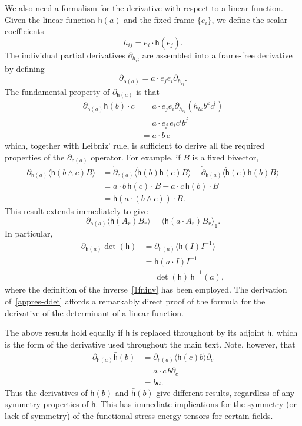 \documentclass[a4paper]{article}
\numberwithin{equation}{section}
\newcommand{\nn}{\nonumber}
\newcommand{\dt}{\! \cdot \!}
\newcommand{\wdg}{\! \wedge \!}
\newcommand{\la}{\langle}
\newcommand{\ra}{\rangle}
\newcommand{\eqv}{=}
\newcommand{\dc}{\partial_c}
\newcommand{\lih}{\mathsf{h}}
\newcommand{\lbh}{\bar{\mathsf{h}}}
\newcommand{\ho}{\lbh}
\newcommand{\hu}{\lih}
\newcommand{\dhua}{\partial_{\hu(a)}}
\newcommand{\dhu}{\dot{\lih}}
\begin{document}
We also need a formalism for the derivative with respect to a linear
function.  Given the linear function $\hu(a)$ and the fixed frame
$\{e_i\}$, we define the scalar coefficients
%
\begin{equation}
h_{ij} \eqv e_i \dt \hu(e_j).  
\label{6defhij}
\end{equation}
%
The individual partial derivatives $\partial_{h_{ij}}$ are
assembled into a frame-free derivative by defining
%
\begin{equation}
\dhua \eqv a \dt e_j e_i \partial_{h_{ij}}.
\label{appres-dhu}
\end{equation}
%
The fundamental property of $\dhua$ is that
%
\begin{align}
\dhua \hu(b) \dt c &=  a \dt e_j e_i \partial_{h_{ij}} (h_{lk} b^k
c^l) \nn \\
&=  a \dt e_j \, e_i c^i b^j \nn \\
&= a \dt b \, c
\end{align}
%
which, together with Leibniz' rule, is sufficient to derive all the
required properties of the $\dhua$ operator.  For example, if $B$ is a
fixed bivector, 
%
\begin{align} 
\dhua \la \hu(b \wdg c) B \ra 
&= \dot{\partial}_{\hu(a)} \la \dhu(b) \hu(c) B \ra -
\dot{\partial}_{\hu(a)} \la \dhu (c) \hu(b) B \ra \nn \\ 
&= a \dt b \, \hu(c) \dt B - a \dt c \, \hu(b) \dt B \nn \\
&= \hu(a \dt (b \wdg c)) \dt B .
\end{align}
%
This result extends immediately to give
%
\begin{equation}
\dhua \la \hu(A_r) B_r \ra = \la \hu(a \dt A_r) B_r \ra_1.
\end{equation}
%
In particular, 
%
\begin{align} 
\dhua \det(\hu)
&= \dhua \la \hu(I) I^{-1} \ra \nn \\
&= \hu(a \dt I) I^{-1} \nn \\
&= \det(\hu) \, \ho^{-1}(a) ,
\label{appres-ddet}
\end{align}
%
where the definition of the inverse~\eqref{1fninv} has been employed.  The
derivation of~\eqref{appres-ddet} affords a remarkably direct proof of the
formula for the derivative of the determinant of a linear function.


The above results hold equally if $\hu$ is replaced throughout by its
adjoint $\ho$, which is the form of the derivative used throughout the
main text.  Note, however, that
%
\begin{align}  
\dhua \ho(b) &= \dhua \la \hu(c) b \ra \dc \nn \\
&= a \dt c \, b \dc \nn \\
&=  ba.
\end{align} 
%
Thus the derivatives of $\hu(b)$ and $\ho(b)$ give different results,
regardless of any symmetry properties of $\hu$.  This has immediate
implications for the symmetry (or lack of symmetry) of the functional
stress-energy tensors for certain fields.
\end{document}
